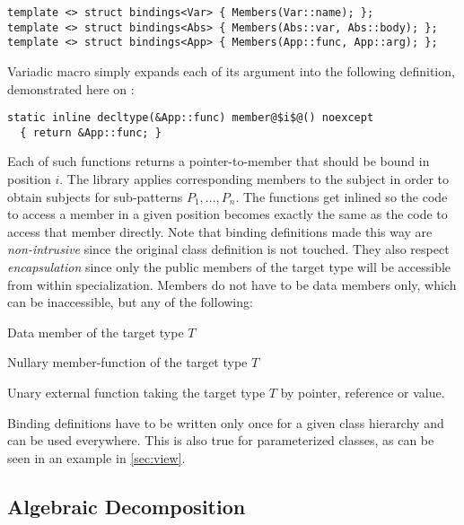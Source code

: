 \begin{lstlisting}
template <> struct bindings<Var> { Members(Var::name); };
template <> struct bindings<Abs> { Members(Abs::var, Abs::body); };
template <> struct bindings<App> { Members(App::func, App::arg); };
\end{lstlisting}

\noindent
Variadic macro  simply expands each of its argument into the 
following definition, demonstrated here on :

\begin{lstlisting}
static inline decltype(&App::func) member@$i$@() noexcept 
  { return &App::func; }
\end{lstlisting}

\noindent
Each of such functions returns a pointer-to-member that should be bound in 
position $i$. The library applies corresponding members to the subject in order 
to obtain subjects for sub-patterns $P_1,...,P_n$. The functions get inlined so 
the code to access a member in a given position becomes exactly the same as the 
code to access that member directly. Note that binding definitions made this way 
are \emph{non-intrusive} since the original class definition is not touched. 
They also respect \emph{encapsulation} since only the public members of the 
target type will be accessible from within  specialization. 
Members do not have to be data members only, which can be inaccessible, but any 
of the following:

\begin{compactitem}
\setlength{\itemsep}{0pt}
\setlength{\parskip}{0pt}
\item Data member of the target type $T$
\item Nullary member-function of the target type $T$
\item Unary external function taking the target type $T$ by pointer, reference or value.
\end{compactitem}

\noindent
Binding definitions have to be written only once for a given class hierarchy and 
can be used everywhere. This is also true for parameterized classes, as can be 
seen in an example in \textsection\ref{sec:view}.


\subsection{Algebraic Decomposition}
\label{sec:slv}

